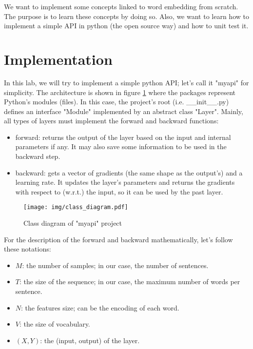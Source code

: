 \documentclass{../../../extra/aakpract/aakpract}
\begin{document}
\maketitle

\begin{center}
	\begin{minipage}{0.8\textwidth}
		\small
		We want to implement some concepts linked to word embedding from scratch.
		The purpose is to learn these concepts by doing so.
		Also, we want to learn how to implement a simple API in python (the open source way) and how to unit test it.
	\end{minipage}
\end{center}

\section{Implementation}

In this lab, we will try to implement a simple python API; let's call it "myapi" for simplicity.
The architecture is shown in figure \ref{fig:myapi} where the packages represent Python's modules (files).
In this case, the project's root (i.e. \_\_init\_\_.py) defines an interface "Module" implemented by an abstract class "Layer".
Mainly, all types of layers must implement the forward and backward functions:
\begin{itemize}
	\item forward: returns the output of the layer based on the input and internal parameters if any. 
	It may also save some information to be used in the backward step.
	\item backward: gets a vector of gradients (the same shape as the output's) and a learning rate.
	It updates the layer's parameters and returns the gradients with respect to (w.r.t.) the input, so it can be used by the past layer.
\end{itemize}


\begin{figure}[htp]
	\centering
	\texttt{[image: img/class\_diagram.pdf]}
	\caption{Class diagram of "myapi" project}
	\label{fig:myapi}
\end{figure}

For the description of the forward and backward mathematically, let's follow these notations:
\begin{itemize}
	\item $M$: the number of samples; in our case, the number of sentences.
	\item $T$: the size of the sequence; in our case, the maximum number of words per sentence.
	\item $N$: the features size; can be the encoding of each word.
	\item $V$: the size of vocabulary.
	\item $(X, Y)$: the (input, output) of the layer.
\end{itemize}
\end{document}
